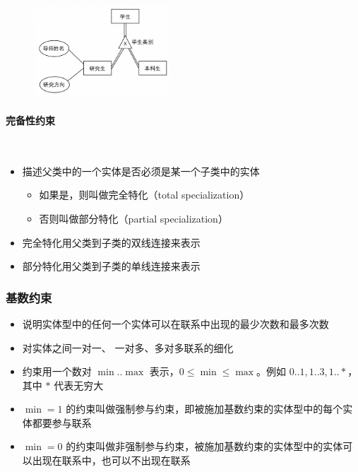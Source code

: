 \begin{figure}[H]
    \vspace{-0.5em}
	\centering
	\includegraphics[width=0.45\textwidth]{images/7.13}
    \vspace{-1em}
\end{figure}

\paragraph*{完备性约束}~{}

\begin{itemize}
    \item 描述父类中的一个实体是否必须是某一个子类中的实体
    \begin{itemize}
        \item 如果是，则叫做完全特化（total specialization）
        \item 否则叫做部分特化（partial specialization）
    \end{itemize}
    \item 完全特化用父类到子类的双线连接来表示
    \item 部分特化用父类到子类的单线连接来表示
\end{itemize}

\subsubsection{基数约束}
\begin{itemize}
    \item 说明实体型中的任何一个实体可以在联系中出现的最少次数和最多次数
    \item 对实体之间一对一、 一对多、多对多联系的细化
    \item 约束用一个数对 $\min .. \max$ 表示，$0\leq \min \leq \max$。例如 $0..1,1..3,1..*$，其中 $*$ 代表无穷大
    \item $\min=1$ 的约束叫做强制参与约束，即被施加基数约束的实体型中的每个实体都要参与联系
    \item $\min=0$ 的约束叫做非强制参与约束，被施加基数约束的实体型中的实体可以出现在联系中，也可以不出现在联系
\end{itemize}

